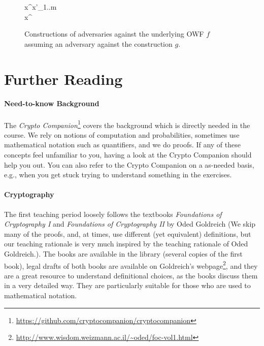 \documentclass[a4paper,table,dvipsnames]{article}
\theoremstyle{definition}
\begin{document}
\begin{figure}
\begin{codebox}
\begin{center}
\begin{pchstack}
{					x^{\prime\prime}\gets x'_{1..m}\\
					\pcreturn x^{\prime\prime}
					}
					\pchspace
					\begin{pcvstack}
					\pcvspace
			\end{pcvstack}
		\end{pchstack}
	\end{center}
	\end{codebox}
	\caption{Constructions of adversaries against the underlying OWF $f$ assuming an adversary against the construction $g$.\label{fig:owfreductions}}
	\end{figure}




\section{Further Reading}
\paragraph{Need-to-know Background} The \emph{Crypto Companion}\footnote{\url{https://github.com/cryptocompanion/cryptocompanion}}
 covers the background which is directly needed in the course. We rely on notions of computation and probabilities, sometimes use mathematical notation such as quantifiers, and we do proofs. If any of these concepts feel unfamiliar to you, having a look at the Crypto Companion should help you out. You can also refer to the Crypto Companion on a as-needed basis, e.g., when you get stuck trying to understand something in the exercises.

\paragraph{Cryptography} The first teaching period loosely follows the textbooks \emph{Foundations of Cryptography I} and \emph{Foundations of Cryptography II} by Oded Goldreich (We skip many of the proofs, and, at times, use different (yet equivalent) definitions, but our teaching rationale is very much inspired by the teaching rationale of Oded Goldreich.). The books are available in the library (several copies of the first book), legal drafts of both books are available on Goldreich's webpage\footnote{\url{http://www.wisdom.weizmann.ac.il/~oded/foc-vol1.html}}, and  they are a great resource to understand definitional choices, as the books discuss them in a very detailed way. They are particularly suitable for those who are used to mathematical notation. 
\end{document}
